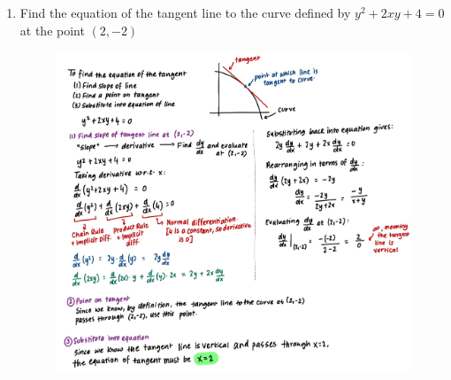 \documentclass{article}
\begin{document}
\begin{enumerate}
    \item Find the equation of the tangent line to the curve defined by $y^2 + 2xy + 4 = 0$ at the point $(2, -2)$
     \begin{figure}[H]
        \centering
        \includegraphics[width=\linewidth]{Q8.jpg}
        \label{fig:Q8}
    \end{figure}
    
\end{enumerate}
\end{document}
